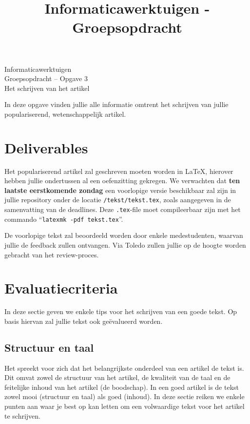 \documentclass[a4paper]{article}
\title{Informaticawerktuigen - Groepsopdracht}
\begin{document}
\begin{center}
  \huge Informaticawerktuigen \\
  \Huge Groepsopdracht -- Opgave 3 \\
  \huge Het schrijven van het artikel
\end{center}
\vspace{1em}

In deze opgave vinden jullie alle informatie omtrent het schrijven van jullie populariserend, wetenschappelijk artikel.


\section{Deliverables}

Het populariserend artikel zal geschreven moeten worden in \LaTeX, hierover hebben jullie ondertussen al een oefenzitting gekregen.
We verwachten dat \textbf{ten laatste eerstkomende zondag} een voorlopige versie beschikbaar zal zijn in jullie repository onder de locatie \texttt{/tekst/tekst.tex}, zoals aangegeven in de samenvatting van de deadlines.
Deze \texttt{.tex}-file moet compileerbaar zijn met het commando ``\texttt{latexmk -pdf tekst.tex}''.

De voorlopige tekst zal beoordeeld worden door enkele medestudenten, waarvan jullie de feedback zullen ontvangen.
Via Toledo zullen jullie op de hoogte worden gebracht van het review-proces.


\section{Evaluatiecriteria}

In deze sectie geven we enkele tips voor het schrijven van een goede tekst.
Op basis hiervan zal jullie tekst ook ge\"evalueerd worden.


\subsection{Structuur en taal}

Het spreekt voor zich dat het belangrijkste onderdeel van een artikel de tekst is.
Dit omvat zowel de structuur van het artikel, de kwaliteit van de taal en de feitelijke inhoud van het artikel (de boodschap).
In een goed artikel is de tekst zowel mooi (structuur en taal) als goed (inhoud).
In deze sectie reiken we enkele punten aan waar je best op kan letten om een volwaardige tekst voor het artikel te schrijven.
\end{document}
